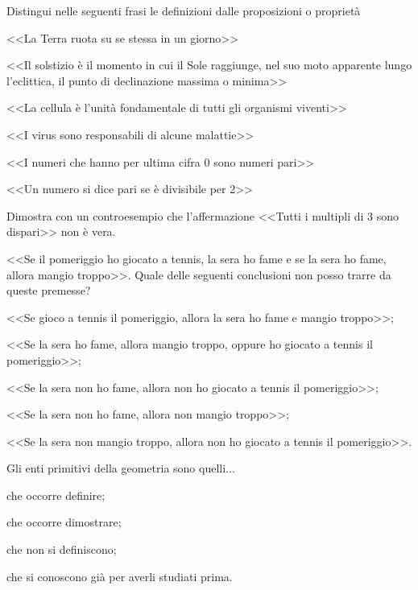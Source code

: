 \begin{esercizio}
Distingui nelle seguenti frasi le definizioni dalle proposizioni o 
proprietà
\begin{enumeratea}
\item <<La Terra ruota su se stessa in un giorno>>		
			\hfill\boxD\quad\boxP
\item <<Il solstizio è il momento in cui il Sole raggiunge, nel suo 
moto apparente lungo l'eclittica, il punto di declinazione massima o 
minima>>			\hfill\boxD\quad\boxP
\item <<La cellula è l'unità fondamentale di tutti gli organismi 
viventi>>\hfill\boxD\quad\boxP
\item <<I virus sono responsabili di alcune 
malattie>>\hfill\boxD\quad\boxP
\item <<I numeri che hanno per ultima cifra 0 sono numeri 
pari>>\hfill\boxD\quad\boxP
\item <<Un numero si dice pari se è divisibile per 
2>>\hfill\boxD\quad\boxP
\end{enumeratea}
\end{esercizio}

\begin{esercizio}
Dimostra con un controesempio che l'affermazione <<Tutti i multipli 
di 3 sono dispari>> non è vera.
\end{esercizio}


\begin{esercizio}
<<Se il pomeriggio ho giocato a tennis, la sera ho fame e se la sera 
ho fame, allora mangio troppo>>. Quale delle seguenti conclusioni non 
posso trarre da queste premesse?
\begin{enumeratea}
\item <<Se gioco a tennis il pomeriggio, allora la sera ho fame e 
mangio troppo>>;
\item <<Se la sera ho fame, allora mangio troppo, oppure ho giocato a 
tennis il pomeriggio>>;
\item <<Se la sera non ho fame, allora non ho giocato a tennis il 
pomeriggio>>;
\item <<Se la sera non ho fame, allora non mangio troppo>>;
\item <<Se la sera non mangio troppo, allora non ho giocato a tennis 
il pomeriggio>>.
\end{enumeratea}
\end{esercizio}


\begin{esercizio}
Gli enti primitivi della geometria sono quelli...
\begin{enumeratea}
\item che occorre definire;
\item che occorre dimostrare;
\item che non si definiscono;
\item che si conoscono già per averli studiati prima.
\end{enumeratea}
\end{esercizio}

